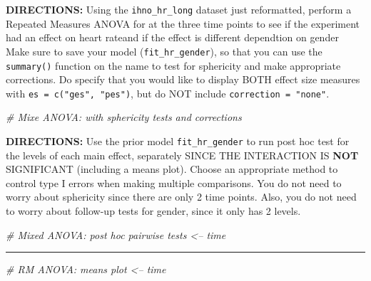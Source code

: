 \documentclass[
]{article}
\newenvironment{Shaded}{\begin{snugshade}}{\end{snugshade}}
\newcommand{\CommentTok}[1]{\textcolor[rgb]{0.56,0.35,0.01}{\textit{#1}}}
\begin{document}
\clearpage

\textbf{DIRECTIONS:} Using the \texttt{ihno\_hr\_long} dataset just
reformatted, perform a Repeated Measures ANOVA for at the three time
points to see if the experiment had an effect on heart rateand if the
effect is different dependtion on gender Make sure to save your model
(\texttt{fit\_hr\_gender}), so that you can use the \texttt{summary()}
function on the name to test for sphericity and make appropriate
corrections. Do specify that you would like to display BOTH effect size
measures with \texttt{es\ =\ c("ges",\ "pes")}, but do NOT include
\texttt{correction\ =\ "none"}.

\begin{Shaded}
\begin{Highlighting}[]
\CommentTok{# Mixe ANOVA:  with sphericity tests and corrections}
\end{Highlighting}
\end{Shaded}

\clearpage

\textbf{DIRECTIONS:} Use the prior model \texttt{fit\_hr\_gender} to run
post hoc test for the levels of each main effect, separately SINCE THE
INTERACTION IS \textbf{NOT} SIGNIFICANT (including a means plot). Choose
an appropriate method to control type I errors when making multiple
comparisons. You do not need to worry about sphericity since there are
only 2 time points. Also, you do not need to worry about follow-up tests
for gender, since it only has 2 levels.

\begin{Shaded}
\begin{Highlighting}[]
\CommentTok{# Mixed ANOVA: post hoc pairwise tests <-- time}
\end{Highlighting}
\end{Shaded}

\begin{center}\rule{0.5\linewidth}{\linethickness}\end{center}

\begin{Shaded}
\begin{Highlighting}[]
\CommentTok{# RM ANOVA: means plot <-- time}
\end{Highlighting}
\end{Shaded}

\clearpage
\end{document}
